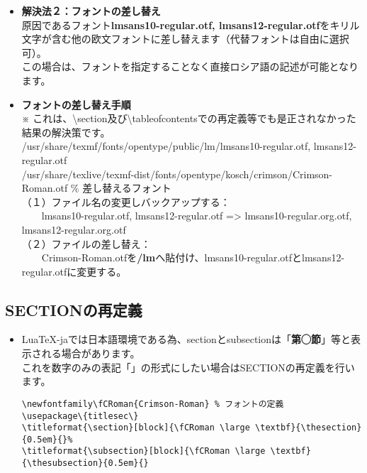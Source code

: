 \documentclass[a4paper,10pt]{ltjsarticle}
\def\colH#1{\color[HTML]{#1}}
\def\fs#1{\fontsize{#1}{#1}\selectfont }
\def\bs{\textbackslash }
\begin{document}
\begin{itemize}
  \item[]\textbf{解決法２：フォントの差し替え}\\
原因であるフォント\textbf{lmsans10-regular.otf, lmsans12-regular.otf}をキリル文字が含む他の欧文フォントに差し替えます（代替フォントは自由に選択可）。\\
この場合は、フォントを指定することなく直接ロシア語の記述が可能となります。
  \item[]\textbf{フォントの差し替え手順}\\
  ※ これは、\bs section及び\bs tableofcontentsでの再定義等でも是正されなかった結果の解決策です。\\
/usr/share/texmf/fonts/opentype/public/lm/{\colH{800000}lmsans10-regular.otf}, {\colH{800000}lmsans12-regular.otf}\\
/usr/share/texlive/texmf-dist/fonts/opentype/kosch/crimson/{\colH{800000}Crimson-Roman.otf} \% 差し替えるフォント\\
（１）ファイル名の変更しバックアップする：\\
　　lmsans10-regular.otf, lmsans12-regular.otf => lmsans10-regular{\colH{800000}.org}.otf, lmsans12-regular{\colH{800000}.org}.otf\\
（２）ファイルの差し替え：\\
　　{\colH{800000}Crimson-Roman.otf}を\textbf{/lm}へ貼付け、lmsans10-regular.otfとlmsans12-regular.otfに変更する。
\end{itemize}

\subsection{SECTIONの再定義}
\begin{itemize}
  \item Lua\TeX{}-jaでは日本語環境である為、{\colH{800000}section}と{\colH{800000}subsection}は「\textbf{第◯節}」等と表示される場合があります。\\
  これを数字のみの表記「\textbf{}」の形式にしたい場合はSECTIONの再定義を行います。
\begin{verbatim}
\newfontfamily\fCRoman{Crimson-Roman} % フォントの定義
\usepackage\{titlesec\}
\titleformat{\section}[block]{\fCRoman \large \textbf}{\thesection}{0.5em}{}% 
\titleformat{\subsection}[block]{\fCRoman \large \textbf}{\thesubsection}{0.5em}{}
\end{verbatim}
\end{itemize}
\end{document}
